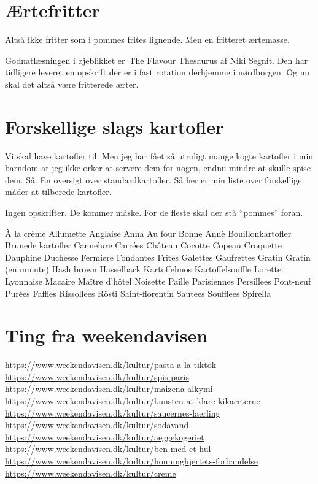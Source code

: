 \documentclass[
]{book}
\makeatletter
\newcommand*\pandocbounded[1]{%
  \sbox\pandoc@box{#1}%
  \Gscale@div\@tempa{\textheight}{\dimexpr\ht\pandoc@box+\dp\pandoc@box\relax}%
  \Gscale@div\@tempb{\linewidth}{\wd\pandoc@box}%
  \ifdim\@tempb\p@<\@tempa\p@\let\@tempa\@tempb\fi%
  \ifdim\@tempa\p@<\p@\scalebox{\@tempa}{\usebox\pandoc@box}%
  \else\usebox{\pandoc@box}%
  \fi%
}
\makeatother
\begin{document}
\pandocbounded{\texttt{[image: ../images/forret-scaled.jpg]}}

\section{Ærtefritter}\label{uxe6rtefritter}

Altså ikke fritter som i pommes frites lignende. Men en fritteret ærtemasse.

Godnatlæsningen i øjeblikket er~The Flavour Thesaurus af Niki Segnit. Den har tidligere leveret en opskrift der er i fast rotation derhjemme i nørdborgen. Og nu skal det altså være fritterede ærter.

\section{Forskellige slags kartofler}\label{forskellige-slags-kartofler}

Vi skal have kartofler til. Men jeg har fået så utroligt mange kogte kartofler i min barndom at jeg ikke orker at servere dem for nogen, endnu mindre at skulle spise dem. Så. En oversigt over standardkartofler. Så her er min liste over forskellige måder at tilberede kartofler.

Ingen opskrifter. De kommer måske. For de fleste skal der stå ``pommes'' foran.

À la crème
Allumette
Anglaise
Anna
Au four
Bonne Annè
Bouillonkartofler
Brunede kartofler
Cannelure
Carrées
Château
Cocotte
Copeau
Croquette
Dauphine
Duchesse
Fermiere
Fondantes
Frites
Galettes
Gaufrettes
Gratin
Gratin (en minute)
Hash brown
Hasselback
Kartoffelmos
Kartoffelsouffle
Lorette
Lyonnaise
Macaire
Maître d'hôtel
Noisette
Paille
Parisiennes
Persillees
Pont-neuf
Purées
Faffles
Rissollees
Rösti
Saint-florentin
Sautees
Soufflees
Spirella

\section{Ting fra weekendavisen}\label{ting-fra-weekendavisen}

\url{https://www.weekendavisen.dk/kultur/pasta-a-la-tiktok}
\url{https://www.weekendavisen.dk/kultur/spis-paris}
\url{https://www.weekendavisen.dk/kultur/maizena-alkymi}
\url{https://www.weekendavisen.dk/kultur/kunsten-at-klare-kikaerterne}
\url{https://www.weekendavisen.dk/kultur/saucernes-laerling}
\url{https://www.weekendavisen.dk/kultur/sodavand}
\url{https://www.weekendavisen.dk/kultur/aeggekogeriet}
\url{https://www.weekendavisen.dk/kultur/ben-med-et-hul}
\url{https://www.weekendavisen.dk/kultur/honninghjertets-forbandelse}
\url{https://www.weekendavisen.dk/kultur/creme}
\end{document}

